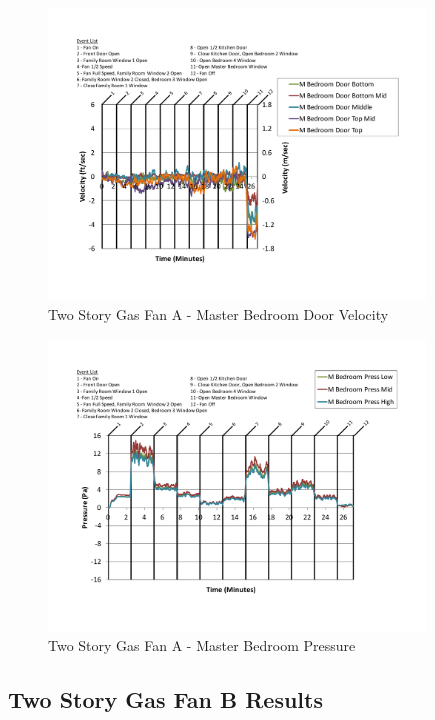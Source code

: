 \documentclass{article}
\begin{document}
\begin{appendices}
	\begin{figure}[H]
		\centering
		\includegraphics[height=3.05in,trim=0.67in 1.1in 0.67in 0.8in,clip=true]{0_Images/Results_Charts/ColdFlow/Two_Story/Gas/A/Master_Bedroom_Door_Velocity.pdf}
		\caption{Two Story Gas Fan A - Master Bedroom Door Velocity}
	\end{figure}
 

	\begin{figure}[H]
		\centering
		\includegraphics[height=3.05in,trim=0.67in 1.1in 0.67in 0.8in,clip=true]{0_Images/Results_Charts/ColdFlow/Two_Story/Gas/A/Master_Bedroom_Pressure.pdf}
		\caption{Two Story Gas Fan A - Master Bedroom Pressure}
	\end{figure}
 
	\clearpage

		\clearpage
\clearpage		\large
\subsection{Two Story Gas Fan B Results} \label{App:Two_StoryGasFanBResults} 


\end{appendices}
\end{document}
